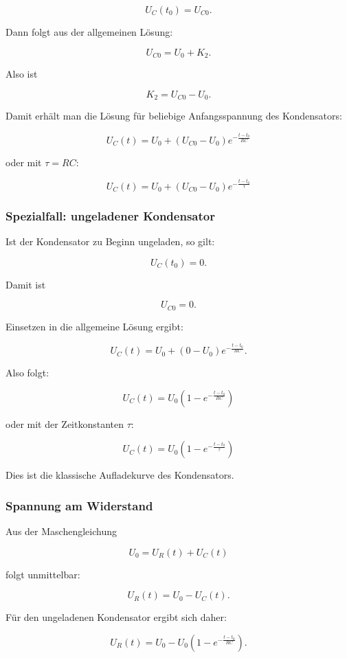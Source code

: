 \[
U_C(t_0)=U_{C0}.
\]

Dann folgt aus der allgemeinen Lösung:

\[
U_{C0}=U_0+K_2.
\]

Also ist

\[
K_2 = U_{C0}-U_0.
\]

Damit erhält man die Lösung für beliebige Anfangsspannung des Kondensators:

\[
\boxed{
	U_C(t)=U_0+\left(U_{C0}-U_0\right)e^{-\frac{t-t_0}{R C}}
}
\]

oder mit $\tau=RC$:

\[
\boxed{
	U_C(t)=U_0+\left(U_{C0}-U_0\right)e^{-\frac{t-t_0}{\tau}}
}
\]

\subsubsection{Spezialfall: ungeladener Kondensator}
\label{subsubsec:ungeladener-kondensator-rc-schaltung}

Ist der Kondensator zu Beginn ungeladen, so gilt:

\[
U_C(t_0)=0.
\]

Damit ist

\[
U_{C0}=0.
\]

Einsetzen in die allgemeine Lösung ergibt:

\[
U_C(t)
=
U_0+\left(0-U_0\right)e^{-\frac{t-t_0}{R C}}.
\]

Also folgt:

\[
\boxed{
	U_C(t)=U_0\left(1-e^{-\frac{t-t_0}{R C}}\right)
}
\]

oder mit der Zeitkonstanten $\tau$:

\[
\boxed{
	U_C(t)=U_0\left(1-e^{-\frac{t-t_0}{\tau}}\right)
}
\]

Dies ist die klassische Aufladekurve des Kondensators.

\subsubsection{Spannung am Widerstand}
\label{subsubsec:spannung-am-widerstand-rc-schaltung}

Aus der Maschengleichung

\[
U_0 = U_R(t)+U_C(t)
\]

folgt unmittelbar:

\[
U_R(t)=U_0-U_C(t).
\]

Für den ungeladenen Kondensator ergibt sich daher:

\[
U_R(t)
=
U_0
-
U_0\left(1-e^{-\frac{t-t_0}{R C}}\right).
\]

